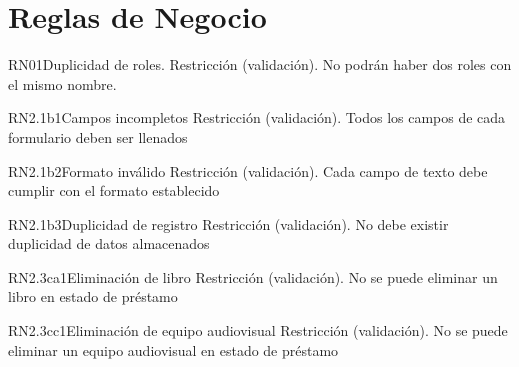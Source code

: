 \section{Reglas de Negocio}

\begin{BussinesRule}{RN01}{Duplicidad de roles.} 
	\BRitem[Tipo:] Restricción (validación).
	\BRitem[Descripción:]No podrán haber dos roles con el mismo nombre.
\end{BussinesRule}


\begin{BussinesRule}{RN2.1b1}{Campos incompletos} 
	\BRitem[Tipo:] Restricción (validación).
	\BRitem[Descripción:] Todos los campos de cada formulario deben ser llenados
\end{BussinesRule}


\begin{BussinesRule}{RN2.1b2}{Formato inválido} 
	\BRitem[Tipo:] Restricción (validación).
	\BRitem[Descripción:] Cada campo de texto debe cumplir con el formato establecido
\end{BussinesRule}


\begin{BussinesRule}{RN2.1b3}{Duplicidad de registro} 
	\BRitem[Tipo:] Restricción (validación).
	\BRitem[Descripción:] No debe existir duplicidad de datos almacenados
\end{BussinesRule}

\begin{BussinesRule}{RN2.3ca1}{Eliminación de libro} 
	\BRitem[Tipo:] Restricción (validación).
	\BRitem[Descripción:] No se puede eliminar un libro en estado de préstamo
\end{BussinesRule}

\begin{BussinesRule}{RN2.3cc1}{Eliminación de equipo audiovisual} 
	\BRitem[Tipo:] Restricción (validación).
	\BRitem[Descripción:] No se puede eliminar un equipo audiovisual en estado de préstamo
\end{BussinesRule}


